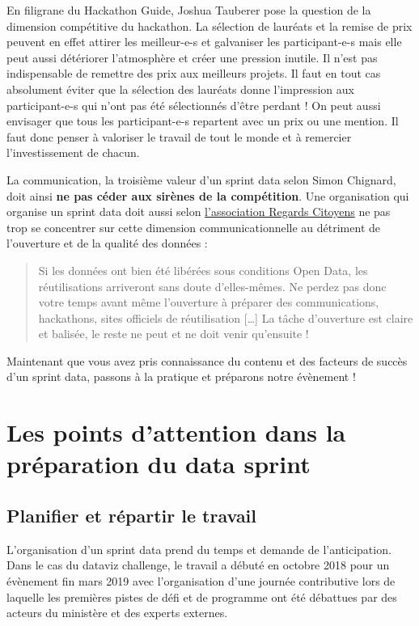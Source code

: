\documentclass[]{book}
\begin{document}
En filigrane du Hackathon Guide, Joshua Tauberer pose la question de la
dimension compétitive du hackathon. La sélection de lauréats et la
remise de prix peuvent en effet attirer les meilleur-e-s et galvaniser
les participant-e-s mais elle peut aussi détériorer l'atmosphère et
créer une pression inutile. Il n'est pas indispensable de remettre des
prix aux meilleurs projets. Il faut en tout cas absolument éviter que la
sélection des lauréats donne l'impression aux participant-e-s qui n'ont
pas été sélectionnés d'être perdant ! On peut aussi envisager que tous
les participant-e-s repartent avec un prix ou une mention. Il faut donc
penser à valoriser le travail de tout le monde et à remercier
l'investissement de chacun.

La communication, la troisième valeur d'un sprint data selon Simon
Chignard, doit ainsi \textbf{ne pas céder aux sirènes de la
compétition}. Une organisation qui organise un sprint data doit aussi
selon
\href{https://www.regardscitoyens.org/apprenons-des-echecs-de-la-dila-episode-1-comment-faire-de-lopen-data/}{l'association
Regards Citoyens} ne pas trop se concentrer sur cette dimension
communicationnelle au détriment de l'ouverture et de la qualité des
données :

\begin{quote}
Si les données ont bien été libérées sous conditions Open Data, les
réutilisations arriveront sans doute d'elles-mêmes. Ne perdez pas donc
votre temps avant même l'ouverture à préparer des communications,
hackathons, sites officiels de réutilisation {[}\ldots{}{]} La tâche
d'ouverture est claire et balisée, le reste ne peut et ne doit venir
qu'ensuite !
\end{quote}

Maintenant que vous avez pris connaissance du contenu et des facteurs de
succès d'un sprint data, passons à la pratique et préparons notre
évènement !

\chapter{Les points d'attention dans la préparation du data
sprint}\label{preparation}

\section{Planifier et répartir le
travail}\label{planifier-et-repartir-le-travail}

L'organisation d'un sprint data prend du temps et demande de
l'anticipation. Dans le cas du dataviz challenge, le travail a débuté en
octobre 2018 pour un évènement fin mars 2019 avec l'organisation d'une
journée contributive lors de laquelle les premières pistes de défi et de
programme ont été débattues par des acteurs du ministère et des experts
externes.
\end{document}
